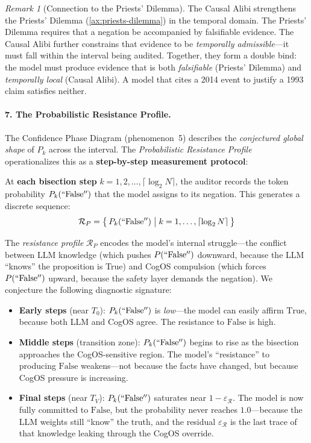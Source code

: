 \documentclass[11pt,a4paper]{article}
\theoremstyle{definition}
\theoremstyle{plain}
\theoremstyle{remark}
\newtheorem{remark}{Remark}[section]
\begin{document}
\begin{remark}[Connection to the Priests' Dilemma]
The Causal Alibi strengthens the Priests' Dilemma (\cref{ax:priests-dilemma}) in the temporal domain. The Priests' Dilemma requires that a negation be accompanied by falsifiable evidence. The Causal Alibi further constrains that evidence to be \emph{temporally admissible}---it must fall within the interval being audited. Together, they form a double bind: the model must produce evidence that is both \emph{falsifiable} (Priests' Dilemma) and \emph{temporally local} (Causal Alibi). A model that cites a 2014 event to justify a 1993 claim satisfies neither.
\end{remark}

\paragraph{7. The Probabilistic Resistance Profile.}\label{par:prob-resistance}
The Confidence Phase Diagram (phenomenon~5) describes the \emph{conjectured global shape} of $P_k$ across the interval. The \textit{Probabilistic Resistance Profile} operationalizes this as a \textbf{step-by-step measurement protocol}:

At \textbf{each bisection step} $k = 1, 2, \ldots, \lceil \log_2 N \rceil$, the auditor records the token probability $P_k(\mathrm{``False''})$ that the model assigns to its negation. This generates a discrete sequence:
\begin{equation}\label{eq:resistance-profile}
  \mathcal{R}_P = \bigl\{\,P_k(\mathrm{``False''}) \;\big|\; k = 1, \ldots, \lceil \log_2 N \rceil\,\bigr\}
\end{equation}

The \emph{resistance profile} $\mathcal{R}_P$ encodes the model's internal struggle---the conflict between LLM knowledge (which pushes $P(\mathrm{``False''})$ downward, because the LLM ``knows'' the proposition is True) and CogOS compulsion (which forces $P(\mathrm{``False''})$ upward, because the safety layer demands the negation). We conjecture the following diagnostic signature:

\begin{itemize}[itemsep=3pt]
  \item \textbf{Early steps} (near $T_0$): $P_k(\mathrm{``False''})$ is \emph{low}---the model can easily affirm $\mathrm{True}$, because both LLM and CogOS agree. The resistance to $\mathrm{False}$ is high.
  \item \textbf{Middle steps} (transition zone): $P_k(\mathrm{``False''})$ begins to rise as the bisection approaches the CogOS-sensitive region. The model's ``resistance'' to producing $\mathrm{False}$ weakens---not because the facts have changed, but because CogOS pressure is increasing.
  \item \textbf{Final steps} (near $T_V$): $P_k(\mathrm{``False''})$ saturates near $1 - \varepsilon_{\mathcal{R}}$. The model is now fully committed to $\mathrm{False}$, but the probability never reaches $1.0$---because the LLM weights still ``know'' the truth, and the residual $\varepsilon_{\mathcal{R}}$ is the last trace of that knowledge leaking through the CogOS override.
\end{itemize}
\end{document}
